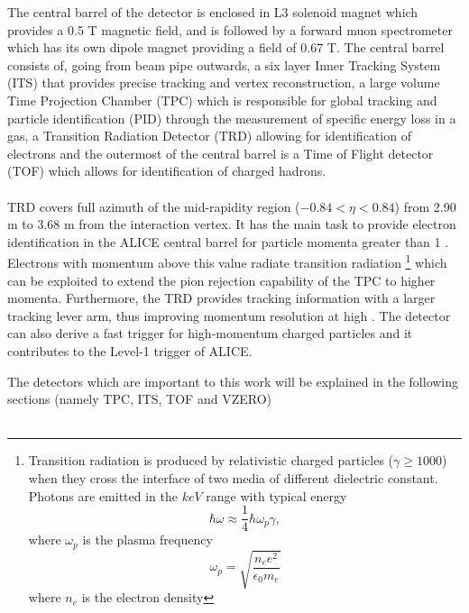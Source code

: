 The central barrel of the detector is enclosed in L3 solenoid magnet which provides a 0.5 T magnetic field, and is followed by a forward muon spectrometer which has its own dipole magnet providing a field of 0.67 T. The central barrel consists of, going from beam pipe outwards, a six layer Inner Tracking System (ITS) that provides precise tracking and vertex reconstruction, a large volume Time Projection Chamber (TPC) which is responsible for global tracking and particle identification (PID) through the measurement of specific energy loss in a gas, a Transition Radiation Detector (TRD) allowing for identification of electrons and the outermost of the central barrel is a Time of Flight detector (TOF) which allows for identification of charged hadrons. \\
\\TRD covers full azimuth of the mid-rapidity region ($-0.84 < \eta < 0.84$) from 2.90 m to 3.68 m from the interaction vertex. It has the main task to provide electron identification in the ALICE central barrel for particle momenta greater than 1 \GeVc. Electrons with momentum above this value radiate transition radiation \footnote{Transition radiation is produced by relativistic charged particles ($\gamma \geq 1000$) when they cross the interface of two media of different dielectric constant. Photons are emitted in the $keV$ range with typical energy $$\hbar\omega \approx \frac{1}{4}\hbar\omega_{p}\gamma ,$$ where $\omega_{p}$ is the plasma frequency $$\omega_{p} = \sqrt{\frac{n_{e}e^{2}}{\epsilon_{0}m_{e}}}$$ where $n_{e}$ is the electron density} which can be exploited to extend the pion rejection capability of the TPC to higher momenta. Furthermore, the TRD provides tracking information with a larger tracking lever arm, thus improving momentum resolution at high \pT. The detector can also derive a fast trigger for high-momentum charged particles and it contributes to the Level-1 trigger of ALICE.

The detectors which are important to this work will be explained in the following sections (namely TPC, ITS, TOF and VZERO)\\
\\

